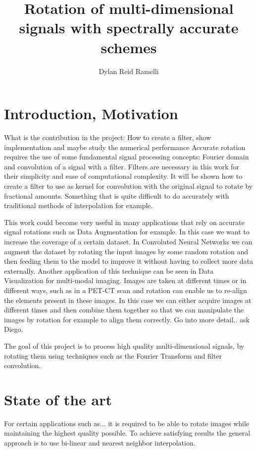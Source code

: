 \documentclass[]{usiinfbachelorproject}
\title{Rotation of multi-dimensional signals with spectrally accurate schemes}
\author{Dylan Reid Ramelli}
\begin{document}
	
	\maketitle
		
		
	\tableofcontents
	\newpage
	\section{Introduction, Motivation}\label{introduction}
	
	
	What is the contribution in the project: How to create a filter, show implementation and maybe study the numerical performance
	Accurate rotation requires the use of some fundamental signal processing concepts: Fourier domain and convolution of a signal with a filter. Filters are necessary in this work for their simplicity and ease of computational complexity. It will be shown how to create a filter to use as kernel for convolution with the original signal to rotate by fractional amounts. Something that is quite difficult to do accurately with traditional methods of interpolation for example. 
	
	
	This work could become very useful in many applications that rely on accurate signal rotations such as Data Augmentation for example. In this case we want to increase the coverage of a certain dataset. In Convoluted Neural Networks we can augment the dataset by rotating the input images by some random rotation and then feeding them to the model to improve it without having to collect more data externally.
	Another application of this technique can be seen in Data Visualization for multi-modal imaging. Images are taken at different times or in different ways, such as in a PET-CT scan and rotation can enable us to re-align the elements present in these images. In this case we can either acquire images at different times and then combine them together so that we can manipulate the images by rotation for example to align them correctly. Go into more detail.. ask Diego.
	
	The goal of this project is to process high quality multi-dimensional signals, by rotating them using techniques such as the Fourier Transform and filter convolution.
	
	
	
	
	\section{State of the art}
	For certain applications such as... it is required to be able to rotate images while maintaining the highest quality possible. To achieve satisfying results the general approach is to use bi-linear and nearest neighbor interpolation.
	
\end{document}
